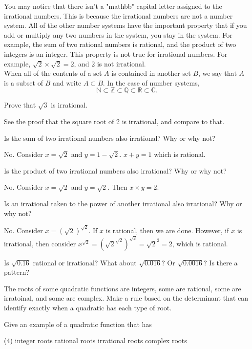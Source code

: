 \documentclass[12pt,fleqn]{book}
\newcommand{\prb}[1]{\begin{Exercise}#1\end{Exercise}}
\newcommand{\sol}[1]{\begin{Answer}#1\end{Answer}}
\begin{document}
You may notice that there isn't a "mathbb" capital letter assigned to the irrational numbers.  This is because the irrational numbers are not a number system.  All of the other number systems have the important property that if you add or multiply any two numbers in the system, you stay in the system.  For example, the sum of two rational numbers is rational, and the product of two integers is an integer.  This property is not true for irrational numbers.  For example, $\sqrt 2 \times \sqrt 2 = 2$, and 2 is not irrational.
\\[2em]
When all of the contents of a set $A$ is contained in another set $B$, we say that $A$ is a subset of $B$ and write $A\subset B$.  In the case of number systems,
$$
    \mathbb N \subset \mathbb Z \subset \mathbb Q \subset \mathbb R \subset \mathbb C.
$$
\clearpage
\prb{Prove that $\sqrt 3$ is irrational.
    \\[4in]
}
\sol{See the proof that the square root of 2 is irrational, and compare to that.}
\prb{Is the sum of two irrational numbers also irrational? Why or why not?
    \\[2in]
}
\sol{No.  Consider $x=\sqrt 2$ and $y=1-\sqrt 2$.  $x+y=1$ which is rational.
}
\prb{Is the product of two irrational numbers also irrational? Why or why not?
    \clearpage
}
\sol{No.  Consider $x=\sqrt 2$ and $y=\sqrt 2$.  Then $x\times y=2$.
}
\prb{Is an irrational taken to the power of another irrational also irrational? Why or why not?
    \\[3in]
}
\sol{No.  Consider $x=(\sqrt 2)^{\sqrt 2}$.  If $x$ is rational, then we are done.  However, if $x$ is irrational, then consider $x^{\sqrt 2}=(\sqrt 2^{\sqrt 2})^{\sqrt 2}=\sqrt 2^2=2$, which is rational.}
\prb{Is $\sqrt {0.16}$ rational or irrational?  What about $\sqrt{0.016}$?  Or $\sqrt {0.0016}$?  Is there a pattern?
    \\[2in]
}
\prb{The roots of some quadratic functions are integers, some are rational, some are irratoinal, and some are complex.  Make a rule based on the determinant that can identify exactly when a quadratic has each type of root.
    \\[4in]
}
\clearpage
\prb{Give an example of a quadratic function that has
    \begin{tasks}(4)
        \task integer roots
        \task rational roots
        \task irrational roots
        \task complex roots
        \\[1in]
    \end{tasks}
}
\end{document}
